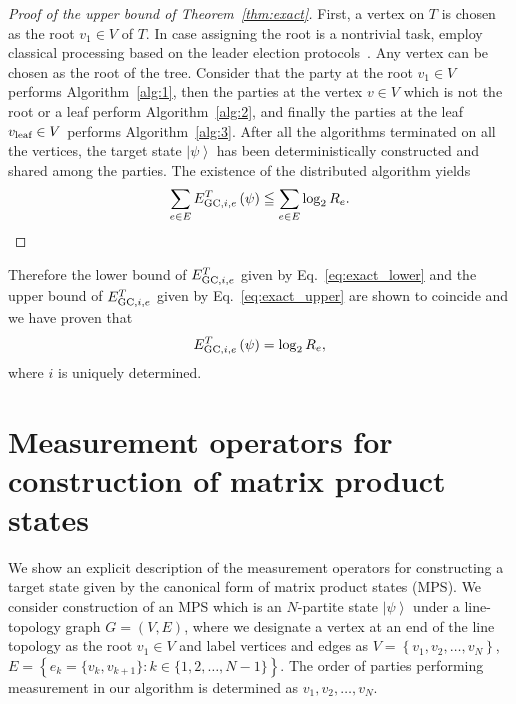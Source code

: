 \documentclass[preprintnumbers,aps,amsmath,amssymb,pra,twocolumn,showpacs,superscriptaddress,floatfix]{revtex4-1}
\def\Ket#1{\left|#1\right\rangle}
\theoremstyle{plain}
\theoremstyle{definition}
\theoremstyle{remark}
\begin{document}
\begin{proof}[Proof of the upper bound of Theorem~\ref{thm:exact}]
First, a vertex on $T$ is chosen as the root $v_1 \in V$ of $T$.   In case assigning the root is a nontrivial task, employ classical processing based on the leader election protocols~\cite{RefWorks:142}.  Any vertex can be chosen as the root of the tree.
Consider that the party at the root $v_1 \in V$ performs Algorithm~\ref{alg:1}, then the parties at the vertex $v\in V$ which is not the root or a leaf perform Algorithm~\ref{alg:2}, and finally the parties at the leaf $v_{\textup{leaf}}\in V$ performs Algorithm~\ref{alg:3}.
After all the algorithms terminated on all the vertices, the target state $\Ket{\psi}$ has been deterministically constructed and shared among the parties.
The existence of the distributed algorithm yields
\begin{equation}
    \label{eq:exact_upper}
    \sum_{e\in E}E_{\textup{GC},i,e}^T\left(\psi\right)\leqq\sum_{e\in E}\log_2 R_e.
\end{equation}
\end{proof}

Therefore the lower bound of $E_{\textup{GC},i,e}^T$ given by Eq.~\eqref{eq:exact_lower} and the upper bound of $E_{\textup{GC},i,e}^T$  given by Eq.~\eqref{eq:exact_upper} are shown to coincide and we have proven that
\[
    E_{\textup{GC},i,e}^T\left(\psi\right)=\log_2 R_e,
\]
where $i$ is uniquely determined.


\section{\label{app:demo} Measurement operators for construction of matrix product states}

We show an explicit description of the measurement operators for constructing a target state given by the canonical form of matrix product states (MPS).  We consider construction of an MPS which is an $N$-partite state $\Ket\psi$ under a line-topology graph $G=(V,E)$, where we designate a vertex at an end of the line topology as the root $v_1\in V$ and label vertices and edges as $V=\left\{v_1,v_2,\ldots,v_N\right\}$, $E=\left\{e_k = \{v_k,v_{k+1}\}\colon k\in\{1,2,\ldots,N-1\}\right\}$.  The order of parties performing measurement in our algorithm is determined as $v_1,v_2,\ldots,v_N$.
\end{document}

